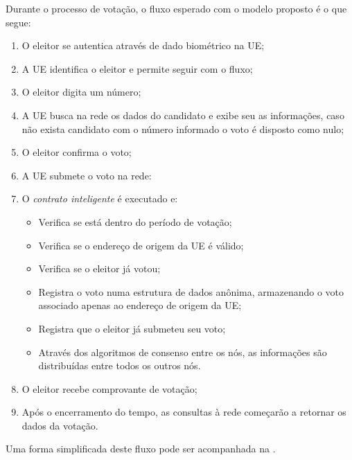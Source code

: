 \documentclass[portuguese]{textolivre}
\begin{document}
	Durante o processo de votação, o fluxo esperado com o modelo proposto é o que segue:
	\begin{enumerate}
		\item O eleitor se autentica através de dado biométrico na UE;
		\item A UE identifica o eleitor e permite seguir com o fluxo;
		\item O eleitor digita um número;
		\item A UE busca na rede os dados do candidato e exibe seu as informações, caso não exista candidato com o número informado o voto é disposto como nulo;
		\item O eleitor confirma o voto;
		\item A UE submete o voto na rede:
		\item O \emph{contrato inteligente} é executado e: \begin{itemize}
			\item Verifica se está dentro do período de votação;
			\item Verifica se o endereço de origem da UE é válido;
			\item Verifica se o eleitor já votou;
			\item Registra o voto numa estrutura de dados anônima, armazenando o voto associado apenas ao endereço de origem da UE;
			\item Registra que o eleitor já submeteu seu voto;
			\item Através dos algoritmos de consenso entre os nós, as informações são distribuídas entre todos os outros nós. 
		\end{itemize} 
		\item O eleitor recebe comprovante de votação;
		\item Após o encerramento do tempo, as consultas à rede começarão a retornar os dados da votação.
	\end{enumerate}
	
	Uma forma simplificada deste fluxo pode ser acompanhada na .
	
\end{document}
